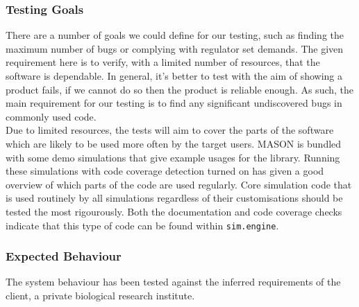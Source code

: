 \documentclass[11pt]{article}
\begin{document}


\subsubsection{Testing Goals}

There are a number of goals we could define for our testing, such as finding the maximum number of bugs or complying with regulator set demands.
The given requirement here is to verify, with a limited number of resources, that the software is dependable.
In general, it's better to test with the aim of showing a product fails, if we cannot do so then the product is reliable enough\cite[pp. 20]{lessons_book}.
As such, the main requirement for our testing is to find any significant undiscovered bugs in commonly used code.
\\

Due to limited resources, the tests will aim to cover the parts of the software which are likely to be used more often by the target users.
MASON is bundled with some demo simulations that give example usages for the library.
Running these simulations with code coverage detection turned on has given a good overview of which parts of the code are used regularly.
Core simulation code that is used routinely by all simulations regardless of their customisations should be tested the most rigourously.
Both the documentation and code coverage checks indicate that this type of code can be found within \texttt{sim.engine}.

\subsubsection{Expected Behaviour}
The system behaviour has been tested against the inferred requirements of the client, a private biological research institute.
\end{document}
